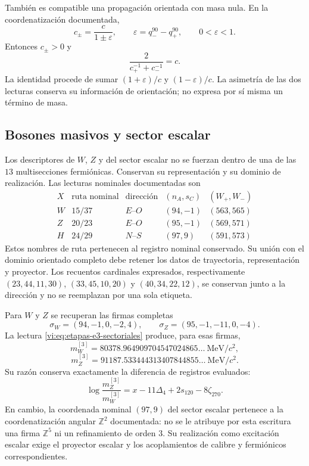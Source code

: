 También es compatible una propagación orientada con masa nula. En la
coordenatización documentada,
\[
 c_\pm=\frac{c}{1\pm\varepsilon},\qquad
 \varepsilon=q_-^{90}-q_+^{90},\qquad0<\varepsilon<1.
\]
Entonces \(c_\pm>0\) y
\[
 \frac{2}{c_+^{-1}+c_-^{-1}}=c.
\]
La identidad procede de sumar \((1+\varepsilon)/c\) y
\((1-\varepsilon)/c\). La asimetría de las dos lecturas conserva su
información de orientación; no expresa por sí misma un término de masa.

\subsection{Bosones masivos y sector escalar}
\label{vi:subsec:bosones-familias}

Los descriptores de \(W\), \(Z\) y del sector escalar no se fuerzan
dentro de una de las \(13\) multisecciones fermiónicas. Conservan su
representación y su dominio de realización. Las lecturas nominales
documentadas son
\[
\begin{array}{c|c|c|c|c}
 X&\text{ruta nominal}&\text{dirección}&(n_A,s_C)&(W_+,W_-)\\\hline
 W&15/37&E\text{--}O&(94,-1)&(563,565)\\
 Z&20/23&E\text{--}O&(95,-1)&(569,571)\\
 H&24/29&N\text{--}S&(97,9)&(591,573)
\end{array}
\]
Estos nombres de ruta pertenecen al registro nominal conservado. Su
unión con el dominio orientado completo debe retener los datos de
trayectoria, representación y proyector. Los recuentos cardinales
expresados, respectivamente \((23,44,11,30)\), \((33,45,10,20)\) y
\((40,34,22,12)\), se conservan junto a la dirección y no se reemplazan
por una sola etiqueta.

Para \(W\) y \(Z\) se recuperan las firmas completas
\[
 \sigma_W=(94,-1,0,-2,4),\qquad
 \sigma_Z=(95,-1,-11,0,-4).
\]
La lectura \eqref{vi:eq:etapas-e3-sectoriales} produce, para esas firmas,
\[
 m_W^{[3]}=80378.964909704547024865\ldots\ \mathrm{MeV}/c^2,
\]
\[
 m_Z^{[3]}=91187.533444313407844855\ldots\ \mathrm{MeV}/c^2.
\]
Su razón conserva exactamente la diferencia de registros evaluados:
\[
 \log\frac{m_Z^{[3]}}{m_W^{[3]}}
 =x-11\Delta_4+2s_{120}-8\zeta_{270}.
\]
En cambio, la coordenada nominal \((97,9)\) del sector escalar pertenece
a la coordenatización angular \(\mathbb Z^2\) documentada: no se le atribuye por
esta escritura una firma \(\mathbb Z^5\) ni un refinamiento de orden
\(3\). Su realización como excitación escalar exige el proyector
escalar y los acoplamientos de calibre y fermiónicos correspondientes.

